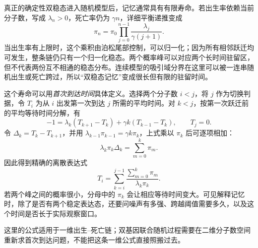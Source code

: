 真正的确定性双稳态进入随机模型后，记忆通常具有有限寿命。若出生率依赖当前分子数，写成 $\lambda_n>0$，死亡率仍为 $\gamma n$，详细平衡递推变成
\[
\pi_n=\pi_0\prod_{j=0}^{n-1}\frac{\lambda_j}{\gamma(j+1)}.
\]
当出生率有上限时，这个乘积由泊松尾部控制，可以归一化；因为所有相邻跃迁均可发生，整条链仍只有一个归一化稳态。两个概率峰可以对应两个长时间驻留区，但不代表两份互不相通的稳态分布。连续模型的吸引域分界在这里可以被一连串随机出生或死亡跨过，所以“双稳态记忆”变成很长但有限的驻留时间。

\noindent\begin{minipage}{\linewidth}\setlength{\parindent}{2em}
这个寿命可以用\emph{首次到达时间}具体定义。选择两个分子数 $i<j$，将 $j$ 作为切换判据，令 $T_i$ 为从 $i$ 出发第一次到达 $j$ 所需的平均时间。对 $k<j$，按第一次跃迁前的平均等待时间分解，有
\[
-1=\lambda_k(T_{k+1}-T_k)+\gamma k(T_{k-1}-T_k),\qquad T_j=0.
\]
令 $\Delta_k=T_k-T_{k+1}$，并用 $\lambda_{k-1}\pi_{k-1}=\gamma k\pi_k$，上式乘以 $\pi_k$ 后可逐项相加：
\[
\lambda_k\pi_k\Delta_k=\sum_{m=0}^{k}\pi_m.
\]
因此得到精确的离散表达式
\[
T_i=\sum_{k=i}^{j-1}\frac{\sum_{m=0}^{k}\pi_m}{\lambda_k\pi_k}.
\]
若两个峰之间的概率很小，分母中的 $\pi_k$ 会让相应等待时间变大。可见解释记忆时，除了是否有两个稳定表达态，还要问噪声有多强、跨越阈值需要多久，以及这个时间是否长于实际观察窗口。\end{minipage}\par
这里的公式适用于一维出生--死亡链；双基因联合随机过程需要在二维分子数空间重新求首次到达问题，不能把这条一维公式直接照搬过去。
